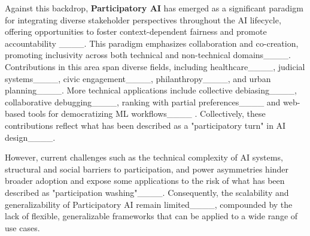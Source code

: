 Against this backdrop, \textbf{Participatory AI} has emerged as a significant paradigm for integrating diverse stakeholder perspectives throughout the AI lifecycle, offering opportunities to foster context-dependent fairness and promote accountability ____. This paradigm emphasizes collaboration and co-creation, promoting inclusivity across both technical and non-technical domains____. Contributions in this area span diverse fields, including healthcare____, judicial systems____, civic engagement____, philanthropy____, and urban planning____. More technical applications include collective debiasing____, collaborative debugging____, ranking with partial preferences____ and web-based tools for democratizing ML workflows____ . Collectively, these contributions reflect what has been described as a "participatory turn" in AI design____.

However, current challenges such as the technical complexity of AI systems, structural and social barriers to participation, and power asymmetries hinder broader adoption and expose some applications to the risk of what has been described as "participation washing"____. Consequently, the scalability and generalizability of Participatory AI remain limited____, compounded by the lack of flexible, generalizable frameworks that can be applied to a wide range of use cases.